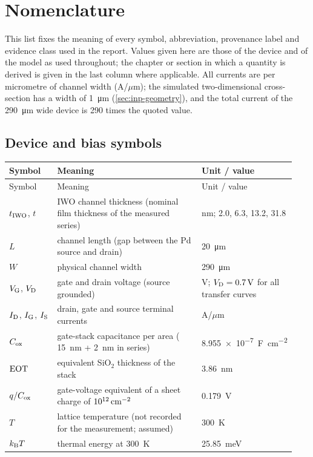 \chapter*{Nomenclature}
\label{ch:nomenclature}

This list fixes the meaning of every symbol, abbreviation, provenance label and evidence class used in the report.
Values given here are those of the device and of the model as used throughout; the chapter or section in which a quantity is
derived is given in the last column where applicable. All currents are per micrometre of channel width
(A/$\mu$m); the simulated two-dimensional cross-section has a width of \SI{1}{\micro\metre}
(\cref{sec:inp-geometry}), and the total current of the \SI{290}{\micro\metre} wide device is 290 times the quoted value.

\section*{Device and bias symbols}
{\small
\begin{longtable}{@{}p{0.17\linewidth}p{0.53\linewidth}p{0.24\linewidth}@{}}
\toprule
Symbol & Meaning & Unit / value \\
\midrule
\endfirsthead
\toprule
Symbol & Meaning & Unit / value \\
\midrule
\endhead
\bottomrule
\endfoot
$t_{\mathrm{IWO}}$, $t$ & IWO channel thickness (nominal film thickness of the measured series) & nm; 2.0, 6.3, 13.2, 31.8 \\
$L$ & channel length (gap between the Pd source and drain) & \SI{20}{\micro\metre} \\
$W$ & physical channel width & \SI{290}{\micro\metre} \\
$V_{\mathrm{G}}$, $V_{\mathrm{D}}$ & gate and drain voltage (source grounded) & V; $V_{\mathrm{D}} = \SI{0.7}{V}$ for all transfer curves \\
$I_{\mathrm{D}}$, $I_{\mathrm{G}}$, $I_{\mathrm{S}}$ & drain, gate and source terminal currents & A/$\mu$m \\
$C_{\mathrm{ox}}$ & gate-stack capacitance per area (\HfO{} \SI{15}{nm} + \AlO{} \SI{2}{nm} in series) & \SI{8.955e-7}{\farad\per\centi\metre\squared} \\
$\mathrm{EOT}$ & equivalent SiO$_2$ thickness of the stack & \SI{3.86}{nm} \\
$q/C_{\mathrm{ox}}$ & gate-voltage equivalent of a sheet charge of $10^{12}\,\mathrm{cm}^{-2}$ & \SI{0.179}{V} \\
$T$ & lattice temperature (not recorded for the measurement; assumed) & \SI{300}{K} \\
$k_{\mathrm{B}}T$ & thermal energy at \SI{300}{K} & \SI{25.85}{meV} \\
\end{longtable}}

